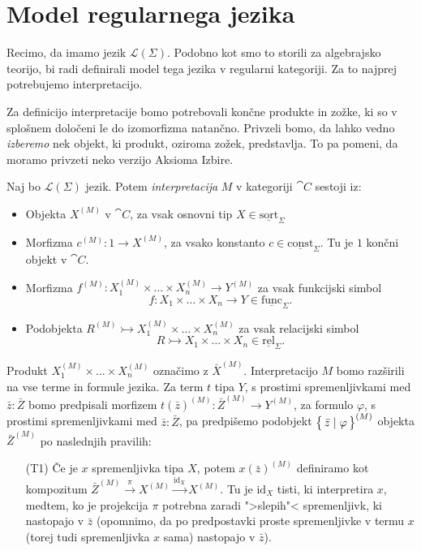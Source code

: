 \documentclass[../kategoricna_logika.tex]{subfiles}
\begin{document}
\section{Model regularnega jezika}
Recimo, da imamo jezik $\mathcal{L}(\Sigma)$. Podobno kot smo to
storili za algebrajsko teorijo, bi radi definirali model tega jezika v
regularni kategoriji.  Za to najprej potrebujemo interpretacijo.
\begin{opomba}
  Za definicijo interpretacije bomo potrebovali končne produkte in
  zožke, ki so v splošnem določeni le do izomorfizma natančno.
  Privzeli bomo, da lahko vedno \emph{izberemo} nek objekt, ki
  produkt, oziroma zožek, predstavlja. To pa pomeni, da moramo
  privzeti neko verzijo Aksioma Izbire.
\end{opomba}
\begin{definicija}
  Naj bo $\mathcal{L}(\Sigma)$ jezik. Potem \emph{interpretacija} $M$
  v kategoriji $\cat{C}$ sestoji iz:
  \begin{itemize}
  \item Objekta $X^{(M)}$ v $\cat{C}$, za vsak osnovni tip
    $X \in \underline{\mathrm{sort}}_\Sigma$
  \item Morfizma $c^{(M)} : 1 \to X^{(M)}$, za vsako konstanto
    $c \in \underline{\mathrm{const}}_\Sigma$. Tu je $1$ končni objekt
    v $\cat{C}$.
  \item Morfizma
    $f^{(M)} : X_1^{(M)} \times \ldots \times X_n^{(M)} \to Y^{(M)}$
    za vsak funkcijski simbol
    \[f : X_1 \times \ldots \times X_n \to Y \in
      \underline{\mathrm{func}}_\Sigma.\]
  \item Podobjekta
    $R^{(M)} \rightarrowtail X_1^{(M)} \times \ldots \times X_n^{(M)}$
    za vsak relacijski simbol
    \[R \rightarrowtail X_1 \times \ldots \times X_n \in
      \underline{\mathrm{rel}}_\Sigma.\]
  \end{itemize}
  Produkt $X_1^{(M)} \times \ldots \times X_n^{(M)}$ označimo z
  $\bar{X}^{(M)}$.  Interpretacijo $M$ bomo razširili na vse terme in
  formule jezika.  Za term $t$ tipa $Y$, s prostimi spremenljivkami
  med $\bar{z} : \bar{Z}$ bomo predpisali morfizem
  $t(\bar{z})^{(M)} : \bar{Z}^{(M)} \to Y^{(M)}$, za formulo
  $\varphi$, s prostimi spremenljivkami med $\bar{z} : \bar{Z}$, pa
  predpišemo podobjekt $\left\lbrace\,\bar{z} \mid \varphi\,\right\rbrace^{(M)}$ objekta
  $\bar{Z}^{(M)}$ po naslednjih pravilih:
  \begin{itemize}
  \item[(T1)] Če je $x$ spremenljivka tipa $X$, potem
    $x(\bar{z})^{(M)}$ definiramo kot kompo\-zi\-tum
    $\bar{Z}^{(M)} \xrightarrow{\pi} X^{(M)}
    \xrightarrow{\mathrm{id}_X} X^{(M)}$.  Tu je $\mathrm{id}_X$
    tisti, ki interpretira $x$, medtem, ko je projekcija $\pi$
    potrebna zaradi ">slepih"< spremenljivk, ki nastopajo v $\bar{z}$
    (opomnimo, da po predpostavki proste spremenljivke v termu $x$
    (torej tudi spremenljivka $x$ sama) nastopajo v $\bar{z}$).


\end{itemize}
\end{definicija}
\end{document}
